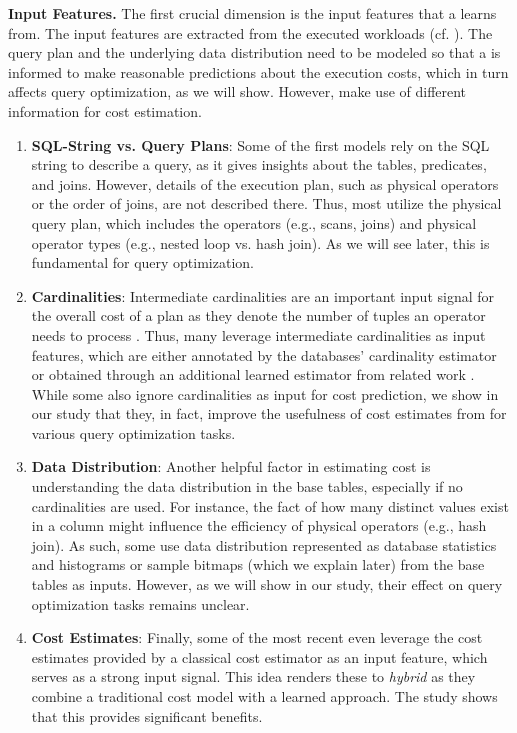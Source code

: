 \noindent\textbf{Input Features.}
The first crucial dimension is the input features that a \lcm learns from.
The input features are extracted from the executed workloads (cf. ).
The query plan and the underlying data distribution need to be modeled so that a \lcm is informed to make reasonable predictions about the execution costs, which in turn affects query optimization, as we will show.
However, \lcms make use of different information for cost estimation.

\begin{enumerate}[leftmargin=*, nosep]
\item \textbf{SQL-String vs. Query Plans}: 
Some of the first models rely on the SQL string to describe a query, as it gives insights about the tables, predicates, and joins. 
However, details of the execution plan, such as physical operators or the order of joins, are not described there. 
Thus, most \lcms utilize the physical query plan, which includes the operators (e.g., scans, joins) and physical operator types  (e.g., nested loop vs. hash join).
As we will see later, this is fundamental for query optimization.

\item \textbf{Cardinalities}:
Intermediate cardinalities are an important input signal for the overall cost of a plan as they denote the number of tuples an operator needs to process \cite{leis_how_2015}.
Thus, many \lcms leverage intermediate cardinalities as input features, which are either annotated by the databases' cardinality estimator or obtained through an additional learned estimator from related work \cite{hilprecht2020deepdb, kipf2019, yang2020}.
While some \lcms also ignore cardinalities as input for cost prediction, we show in our study that they, in fact, improve the usefulness of cost estimates from \lcms for various query optimization tasks.

\item\textbf{Data Distribution}:
Another helpful factor in estimating cost is understanding the data distribution in the base tables, especially if no cardinalities are used.
For instance, the fact of how many distinct values exist in a column might influence the efficiency of physical operators (e.g., hash join). 
As such, some \lcms use data distribution represented as database statistics and histograms or sample bitmaps (which we explain later) from the base tables as inputs.
However, as we will show in our study, their effect on query optimization tasks remains unclear.

\item \textbf{Cost Estimates}: 
Finally, some of the most recent \lcms even leverage the cost estimates provided by a classical cost estimator as an input feature, which serves as a strong input signal.
This idea renders these \lcms to \textit{hybrid} as they combine a traditional cost model with a learned approach.
The study shows that this provides significant benefits.
\end{enumerate}

